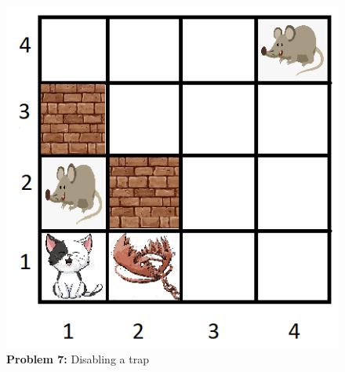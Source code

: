 \begin{minipage}{\textwidth}
\begin{multicols}{2}

\begin{figure}[H]
    \centering
    \includegraphics[width=\linewidth]{fig/A3/cat_07.png}
    \caption{\textbf{Problem 7:} Disabling a trap}
    \label{fig:cat_07}
\end{figure}

\columnbreak


\end{multicols}
\end{minipage}

